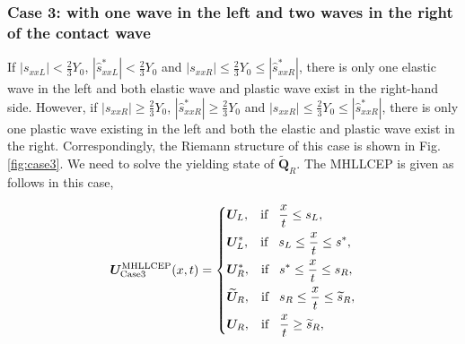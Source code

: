 \documentclass{article}
\numberwithin{equation}{section}
\numberwithin{table}{section}
\begin{document}
\subsubsection {Case 3: with one wave in the left and two  waves in the right of the contact wave}\label{sec:case3}
If  $|s_{xxL}|<\frac{2}{3}Y_0$, $|\hat{s}_{xxL}^*| < \frac{2}{3}Y_0$  and $|s_{xxR}| \le \frac{2}{3}Y_0 \le  |\hat{s}_{xxR}^*|$, there is only one elastic wave in the left and both elastic wave and plastic wave exist in the right-hand side. However, if  $|s_{xxR}|\geq \frac{2}{3}Y_0$, $|\hat{s}_{xxR}^*| \geq \frac{2}{3}Y_0$  and $|s_{xxR}| \le \frac{2}{3}Y_0 \le  |\hat{s}_{xxR}^*|$,  there is only one plastic wave existing in the left and both the elastic and plastic wave exist in the right. Correspondingly, the Riemann structure of this case is shown in Fig.\ref{fig:case3}. We need to solve the yielding state of $\widetilde{\bm{Q}}_R$. The MHLLCEP is given as follows in this case,


 \begin{equation}\label{eq:HLLCEP3}
   \bm{U}^{\text{MHLLCEP}}_{\text{Case3}}(x,t) = \left\{ \begin{aligned}
		& \bm{U}_L, \hspace{0.3cm} \text{if} \hspace{0.3cm} \frac{x}{t}\le s_L, \\
		& \bm{U}_L^*, \hspace{0.3cm} \text{if} \hspace{0.3cm} s_L \le \frac{x}{t} \le s^*, \\
		& \bm{U}_R^*, \hspace{0.3cm} \text{if} \hspace{0.3cm} s^*\le \frac{x}{t} \le s_R, \\
		& \widetilde{\bm{U}}_R, \hspace{0.3cm} \text{if} \hspace{0.3cm} s_R \le \frac{x}{t} \le \widetilde{s}_R,\\
		& \bm{U}_R, \hspace{0.3cm} \text{if} \hspace{0.3cm} \frac{x}{t}\ge \widetilde{s}_R, \\
	  \end{aligned}
	\right.
  \end{equation}
\end{document}
